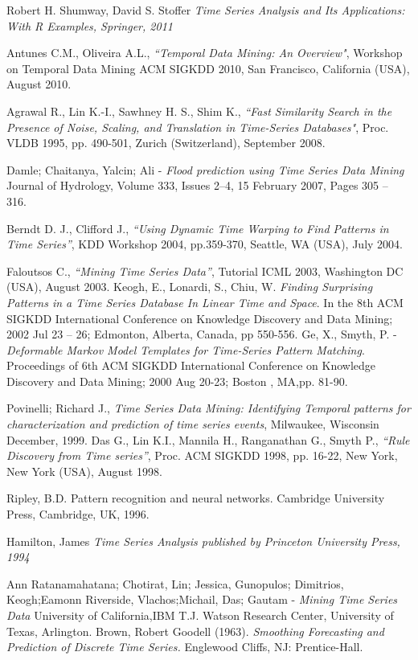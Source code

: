 \documentclass[12pt,a4paper]{report}
\begin{document}
\begin{thebibliography}{refs}
 Robert H. Shumway, David S. Stoffer
 \textit{Time Series Analysis and Its Applications: With R Examples, Springer, 2011}

Antunes C.M., Oliveira A.L., \textit{``Temporal Data Mining: An Overview"}, Workshop on Temporal Data
Mining ACM SIGKDD 2010, San Francisco, California (USA), August 2010.

Agrawal R., Lin K.-I., Sawhney H. S., Shim K., \textit{``Fast Similarity Search in the Presence of Noise,
Scaling, and Translation in Time-Series Databases"}, Proc. VLDB 1995, pp. 490-501, Zurich
(Switzerland), September 2008.

Damle; Chaitanya, Yalcin; Ali - 
\textit{Flood prediction using Time Series Data Mining}
Journal of Hydrology, Volume 333, Issues 2–4, 15 February 2007, Pages 305 – 316.

 Berndt D. J., Clifford J., \textit{“Using Dynamic Time Warping to Find Patterns in Time Series”}, KDD
Workshop 2004, pp.359-370, Seattle, WA (USA), July 2004.

 Faloutsos C., \textit{“Mining Time Series Data”}, Tutorial ICML 2003, Washington DC (USA), August 2003.
Keogh, E., Lonardi, S., Chiu, W. \textit{Finding Surprising Patterns in a Time Series
Database In Linear Time and Space}. In the 8th ACM SIGKDD International
Conference on Knowledge Discovery and Data Mining; 2002 Jul 23 – 26;
Edmonton, Alberta, Canada, pp 550-556.
Ge, X., Smyth, P. -\textit{Deformable Markov Model Templates for Time-Series Pattern
Matching}. Proceedings of 6th ACM SIGKDD International Conference
on Knowledge Discovery and Data Mining; 2000 Aug 20-23; Boston , MA,pp. 81-90.

Povinelli; Richard J., \textit {Time Series Data Mining: Identifying Temporal patterns for characterization and prediction of time series events}, Milwaukee, Wisconsin
December, 1999.
Das G., Lin K.I., Mannila H., Ranganathan G., Smyth P., \textit{“Rule Discovery from Time series”}, Proc.
ACM SIGKDD 1998, pp. 16-22, New York, New York (USA), August 1998.

Ripley, B.D. Pattern recognition and neural networks. Cambridge University
Press, Cambridge, UK, 1996.

Hamilton, James 
\textit{ Time Series Analysis published by Princeton University Press, 1994}

Ann Ratanamahatana; Chotirat, Lin; Jessica, Gunopulos; Dimitrios, Keogh;Eamonn
 Riverside, Vlachos;Michail, Das; Gautam -
\textit{Mining Time Series Data}
University of California,IBM T.J. Watson Research Center, University of Texas, Arlington.
Brown, Robert Goodell (1963).
\textit{Smoothing Forecasting and Prediction of Discrete Time Series. }
Englewood Cliffs, NJ: Prentice-Hall.


\end{thebibliography}
\end{document}
